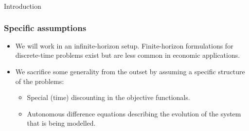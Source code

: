 \documentclass[10pt]{beamer}
\theoremstyle{definition}
\begin{document}
\begin{section}{Introduction}
\begin{frame}[fragile]
\frametitle{Specific assumptions}
\begin{itemize}\itemsep1em
\item We will work in an infinite-horizon setup. Finite-horizon formulations for discrete-time problems exist but are less common in economic applications.
\item We sacrifice some generality from the outset by assuming a specific structure of the problems:
	\begin{itemize}
	\item Special (time) discounting in the objective functionals.
	\item Autonomous difference equations describing the evolution of the system that is being modelled.
	\end{itemize}
\end{itemize}
\end{frame}
\end{section}
\end{document}
